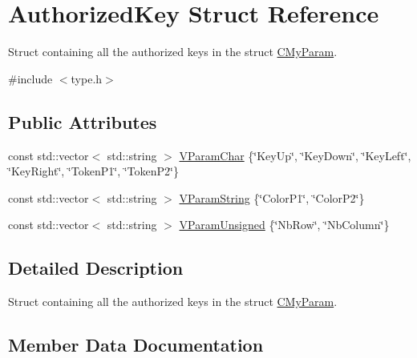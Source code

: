 \hypertarget{struct_authorized_key}{}\section{Authorized\+Key Struct Reference}
\label{struct_authorized_key}


Struct containing all the authorized keys in the struct \hyperlink{struct_c_my_param}{C\+My\+Param}.  




{\ttfamily \#include $<$type.\+h$>$}

\subsection*{Public Attributes}
\begin{DoxyCompactItemize}
\item 
const std\+::vector$<$ std\+::string $>$ \hyperlink{struct_authorized_key_a0cbe7b3f586b39393ccc38cf1d95ff16}{V\+Param\+Char} \{\char`\"{}Key\+Up\char`\"{}, \char`\"{}Key\+Down\char`\"{}, \char`\"{}Key\+Left\char`\"{}, \char`\"{}Key\+Right\char`\"{}, \char`\"{}Token\+P1\char`\"{}, \char`\"{}Token\+P2\char`\"{}\}
\item 
const std\+::vector$<$ std\+::string $>$ \hyperlink{struct_authorized_key_a78305cf96884024f75b2d73a53f0049e}{V\+Param\+String} \{\char`\"{}Color\+P1\char`\"{}, \char`\"{}Color\+P2\char`\"{}\}
\item 
const std\+::vector$<$ std\+::string $>$ \hyperlink{struct_authorized_key_ab8eb36f2144756c872dcf3e18b00b06e}{V\+Param\+Unsigned} \{\char`\"{}Nb\+Row\char`\"{}, \char`\"{}Nb\+Column\char`\"{}\}
\end{DoxyCompactItemize}


\subsection{Detailed Description}
Struct containing all the authorized keys in the struct \hyperlink{struct_c_my_param}{C\+My\+Param}. 

\subsection{Member Data Documentation}
\mbox{\label{struct_authorized_key_a0cbe7b3f586b39393ccc38cf1d95ff16}} 

